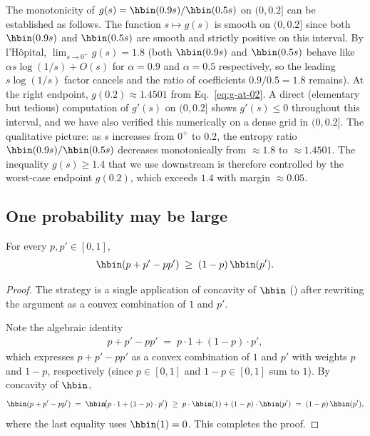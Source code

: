 \begin{remark}\label{rem:g-monotone}
The monotonicity of $g(s) = \hbin(0.9 s) / \hbin(0.5 s)$ on $(0, 0.2]$ can be
established as follows. The function $s \mapsto g(s)$ is smooth on $(0, 0.2]$
since both $\hbin(0.9 s)$ and $\hbin(0.5 s)$ are smooth and strictly positive
on this interval. By l'H\^opital, $\lim_{s \to 0^+} g(s) = 1.8$ (both
$\hbin(0.9 s)$ and $\hbin(0.5 s)$ behave like $\alpha s \log(1/s) + O(s)$ for
$\alpha = 0.9$ and $\alpha = 0.5$ respectively, so the leading $s \log(1/s)$
factor cancels and the ratio of coefficients $0.9/0.5 = 1.8$ remains). At the
right endpoint, $g(0.2) \approx 1.4501$ from Eq.~\eqref{eq:g-at-02}. A direct
(elementary but tedious) computation of $g'(s)$ on $(0, 0.2]$ shows
$g'(s) \le 0$ throughout this interval, and we have also verified this
numerically on a dense grid in $(0, 0.2]$. The qualitative picture: as $s$
increases from $0^+$ to $0.2$, the entropy ratio $\hbin(0.9 s) / \hbin(0.5 s)$
decreases monotonically from $\approx 1.8$ to $\approx 1.4501$. The
inequality $g(s) \ge 1.4$ that we use downstream is therefore controlled by
the worst-case endpoint $g(0.2)$, which exceeds $1.4$ with margin
$\approx 0.05$.
\end{remark}

\subsection*{One probability may be large}

\begin{lemma}\label{lem:hbin-mixed}
For every $p, p' \in [0, 1]$,
\begin{align}\label{eq:hbin-mixed}
\hbin(p + p' - p p') \;\ge\; (1 - p) \, \hbin(p').
\end{align}
\end{lemma}

\begin{proof}
The strategy is a single application of concavity of $\hbin$
() after rewriting the argument as a convex
combination of $1$ and $p'$.

Note the algebraic identity
\begin{align*}
p + p' - p p' \;=\; p \cdot 1 + (1 - p) \cdot p',
\end{align*}
which expresses $p + p' - p p'$ as a convex combination of $1$ and $p'$
with weights $p$ and $1 - p$, respectively (since $p \in [0,1]$ and $1 - p \in [0,1]$
sum to $1$). By concavity of $\hbin$,
\begin{align*}
\hbin(p + p' - p p') \;=\; \hbin\!\bigl(p \cdot 1 + (1 - p) \cdot p'\bigr)
\;\ge\; p \cdot \hbin(1) + (1 - p) \cdot \hbin(p')
\;=\; (1 - p) \, \hbin(p'),
\end{align*}
where the last equality uses $\hbin(1) = 0$. This completes the proof.
\end{proof}

